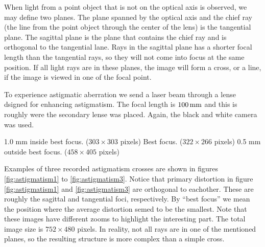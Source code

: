 When light from a point object that is not on the optical axis is observed, we
may define two planes. The plane spanned by the optical axis and the chief ray
(the line from the point object through the center of the lens) is the
tangential plane. The sagittal plane is the plane that contains the chief ray
and is orthogonal to the tangential lane. Rays in the sagittal plane has a
shorter focal length than the tangential rays, so they will not come into focus
at the same position. If all light rays are in these planes, the image will form
a cross, or a line, if the image is viewed in one of the focal point.

To experience astigmatic aberration we send a laser beam through a lense
dsigned for enhancing astigmatism. The focal length is $100 \, \textrm{mm}$ and this is
roughly were the secondary lense was placed. Again, the black and white camera
was used.

      {1.0 mm inside best focus. ($303 \times 303$ pixels)}
      {Best focus. ($322 \times 266$ pixels)}
      {0.5 mm outside best focus. ($458 \times 405$ pixels)}

Examples of three recorded astigmatism crosses are shown in figures
\ref{fig:astigmatism1} to \vref{fig:astigmatism3}. Notice that primary
distortion in figure \ref{fig:astigmatism1} and \ref{fig:astigmatism3} are
orthogonal to eachother. These are roughly the sagittal and tangential foci,
respectively. By ``best focus'' we mean the position where the average
distortion semed to be the smallest. Note that these images have different zooms
to highlight the interesting part. The total image size is $752 \times 480$
pixels. In reality, not all rays are in one of the mentioned planes, so the
resulting structure is more complex than a simple cross.
